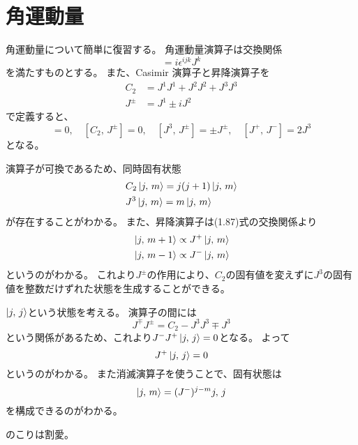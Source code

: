 \documentclass[../../master.tex]{subfiles}
\begin{document}
\section{角運動量}
角運動量について簡単に復習する。
角運動量演算子は交換関係
\begin{equation}
    [J^i,\,J^j] = i\epsilon^{ijk}J^k
\end{equation}
を満たすものとする。
また、Casimir 演算子と昇降演算子を
\begin{align}
    C_2 &= J^1J^1+J^2J^2+J^3J^3\\
    J^{\pm} &= J^1 \pm iJ^2
\end{align}
で定義すると、
\begin{equation}
    [C_2,\,J^3]=0, \quad [C_2,\,J^{\pm}]=0,\quad
    [J^3,\,J^{\pm}] = \pm J^{\pm}, \quad[J^+,\,J^-] = 2J^3
\end{equation}
となる。

演算子が可換であるため、同時固有状態
\begin{align}
    &C_2\ket{j,\,m}=j(j+1)\ket{j,\,m}\\
    &J^3\ket{j,\,m}=m\ket{j,\,m}
\end{align}
が存在することがわかる。
また、昇降演算子は(1.87)式の交換関係より
\begin{align}
    &\ket{j,\,m+1}\propto J^+\ket{j,\,m}\\
    &\ket{j,\,m-1}\propto J^-\ket{j,\,m}
\end{align}
というのがわかる。
これより\(J^{\pm}\)の作用により、\(C_2\)の固有値を変えずに\(J^3\)の固有値を整数だけずれた状態を生成することができる。

\(\ket{j,\,j}\)という状態を考える。
演算子の間には
\begin{equation}
    J^{\mp}J^{\pm}=C_2-J^3J^3\mp J^3
\end{equation}
という関係があるため、これより\(J^-J^+\ket{j,\,j}=0\)となる。
よって
\begin{equation}
    J^+\ket{j,\,j}=0
\end{equation}
というのがわかる。
また消滅演算子を使うことで、固有状態は
\begin{equation}
    \ket{j,\,m} = (J^-)^{j-m}{j,\,j}
\end{equation}
を構成できるのがわかる。

のこりは割愛。
\end{document}

